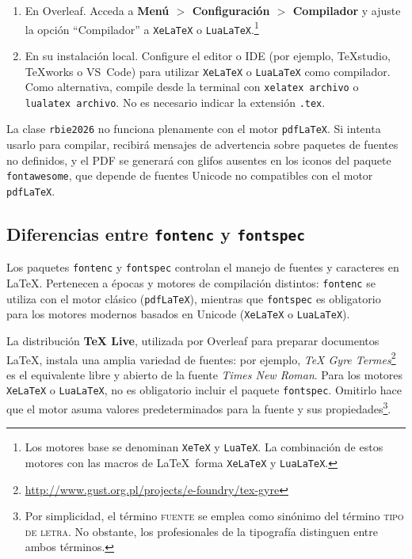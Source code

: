 \documentclass[spanish]{rbie2026}%
\begin{document}
\begin{enumerate}
    \item En Overleaf. Acceda a \textbf{Menú $>$ Configuración $>$ Compilador} y ajuste la opción ``Compilador'' a \texttt{XeLaTeX} o \texttt{LuaLaTeX}.\footnote{Los motores base se denominan \texttt{XeTeX} y \texttt{LuaTeX}. La combinación de estos motores con las macros de \LaTeX\ forma \texttt{XeLaTeX} y \texttt{LuaLaTeX}.}

    \item En su instalación local. Configure el editor o IDE (por ejemplo, TeXstudio, TeXworks o VS~Code) para utilizar \texttt{XeLaTeX} o \texttt{LuaLaTeX} como compilador. Como alternativa, compile desde la terminal con \texttt{xelatex archivo} o \texttt{lualatex archivo}. No es necesario indicar la extensión \texttt{.tex}.
\end{enumerate}

La clase \texttt{rbie2026} no funciona plenamente con el motor \texttt{pdfLaTeX}. Si intenta usarlo para compilar, recibirá mensajes de advertencia sobre paquetes de fuentes no definidos, y el PDF se generará con glifos ausentes en los iconos del paquete \texttt{fontawesome}, que depende de fuentes Unicode no compatibles con el motor \texttt{pdfLaTeX}.


\subsection{Diferencias entre \texttt{fontenc} y \texttt{fontspec}}

Los paquetes \texttt{fontenc} y \texttt{fontspec} controlan el manejo de fuentes y caracteres en \LaTeX. Pertenecen a épocas y motores de compilación distintos: \texttt{fontenc} se utiliza con el motor clásico (\texttt{pdfLaTeX}), mientras que \texttt{fontspec} es obligatorio para los motores modernos basados en Unicode (\texttt{XeLaTeX} o \texttt{LuaLaTeX}).

La distribución \textbf{TeX Live}, utilizada por Overleaf para preparar documentos \LaTeX, instala una amplia variedad de fuentes: por ejemplo, \textit{TeX Gyre Termes}\footnote{\url{http://www.gust.org.pl/projects/e-foundry/tex-gyre}} es el equivalente libre y abierto de la fuente \textit{Times New Roman}. Para los motores \texttt{XeLaTeX} o \texttt{LuaLaTeX}, no es obligatorio incluir el paquete \texttt{fontspec}. Omitirlo hace que el motor asuma valores predeterminados para la fuente y sus propiedades\footnote{Por simplicidad, el término \textsc{fuente} se emplea como sinónimo del término \textsc{tipo de letra}. No obstante, los profesionales de la tipografía distinguen entre ambos términos.}.
\end{document}
